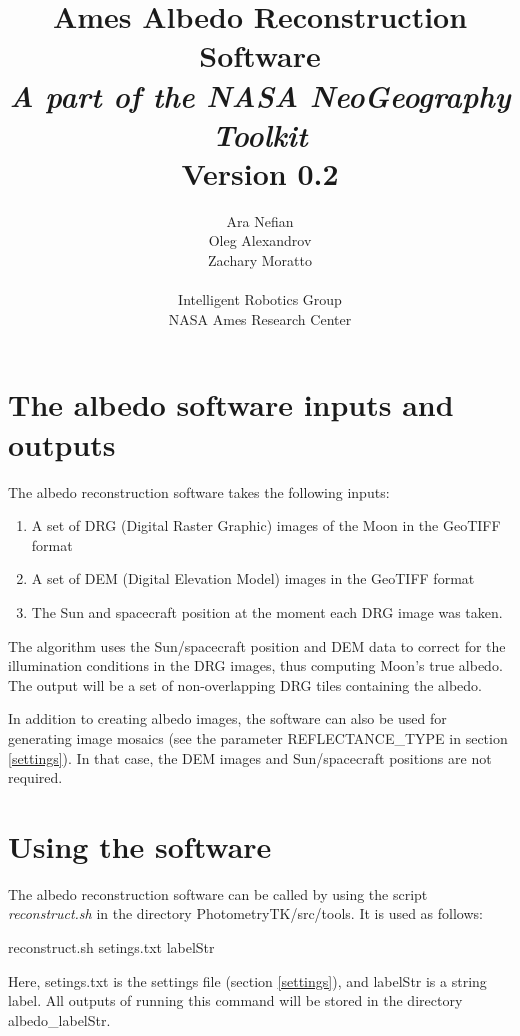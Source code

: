 \documentclass[letterpaper,fleqn,11pt]{report}
\title{{\Huge Ames Albedo Reconstruction Software}\\
{\em A part of the NASA NeoGeography Toolkit}\\
Version 0.2}
\author{
Ara Nefian\\
Oleg Alexandrov\\
Zachary Moratto\\
\\
Intelligent Robotics Group\\
NASA Ames Research Center\\
}
\begin{document}
\maketitle
%
\tableofcontents



\newpage



\section{The albedo software inputs and outputs}\label{inputs_outputs}

The albedo reconstruction software takes the following inputs:
\begin{enumerate}
\item A set of DRG (Digital Raster Graphic) images of the Moon in the GeoTIFF format
\item A set of DEM (Digital Elevation Model) images in the GeoTIFF format
\item The Sun and spacecraft position at the moment each DRG image was
  taken. 
\end{enumerate}

The algorithm uses the Sun/spacecraft position and DEM data to
correct for the illumination conditions in the DRG images, thus
computing Moon's true albedo. The output will be a set of
non-overlapping DRG tiles containing the albedo.

In addition to creating albedo images, the software can also be used
for generating image mosaics (see the parameter REFLECTANCE\_TYPE in
section \ref{settings}). In that case, the DEM images and Sun/spacecraft positions are
not required.

\section{Using the software}

The albedo reconstruction software can be called by using the
script {\it reconstruct.sh} in the directory PhotometryTK/src/tools. It is
used as follows:

reconstruct.sh setings.txt labelStr

Here, setings.txt is the settings file (section \ref{settings}), and
labelStr is a string label. All outputs of running this command will be
stored in the directory albedo\_labelStr.
\end{document}
